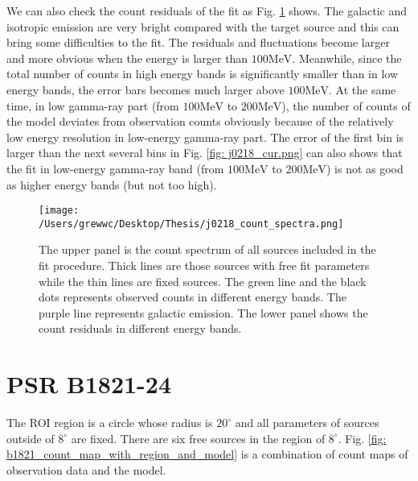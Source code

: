 \documentclass[12pt]{report}
\newcommand{\singleFig}[3]{
  \begin{figure}[!ht]
    \centering
    \texttt{[image: /Users/grewwc/Desktop/Thesis/\#1]}
    \caption{#3}
    \label{fig: #1}
  \end{figure}
}
\newcommand{\Notice}[1]{
  $<$\textbf{Notice}$>$#1$<$\textbf{/Notice}$>$
}
\begin{document}

            We can also check the count residuals of the fit as Fig. 
            \ref{fig: j0218_count_spectra} shows. The galactic and isotropic emission are very 
            bright compared with the target source and this can bring some difficulties to 
            the fit. The residuals and fluctuations become larger and more obvious 
            when the energy is larger than $100\mbox{MeV}$. 
            Meanwhile, since the total number of counts in high energy bands 
            is significantly smaller than in low energy bands, the error bars becomes much 
            larger above $100\mbox{MeV}$. At the same time, in low gamma-ray part 
            (from $100\mbox{MeV}$ to $200\mbox{MeV}$), the number of counts of the model 
            deviates from observation counts obviously because of the relatively low energy 
            resolution in low-energy gamma-ray part. The error of the first bin is larger
            than the next several bins in Fig. \ref{fig: j0218_cur.png} can also shows that 
            the fit in low-energy gamma-ray band (from $100\mbox{MeV}$ to $200\mbox{MeV}$) 
            is not as good as higher energy bands (but not too high). 
            
            \begin{figure}[!ht]
              \centering
              \texttt{[image: /Users/grewwc/Desktop/Thesis/j0218\_count\_spectra.png]}
              \caption{The upper panel is the count spectrum of all sources included in the 
                      fit procedure. Thick lines are those sources with free fit parameters 
                      while the thin lines are fixed sources. The green line and the black 
                      dots represents observed counts in different energy bands. The purple 
                      line represents galactic emission. The lower panel shows the count 
                      residuals in different energy bands. } 
              \label{fig: j0218_count_spectra}
            \end{figure}

            \section{PSR B1821-24}
              The ROI region is a circle whose radius is $20^\circ$ and all 
              parameters of sources outside of $8^\circ$ are fixed. 
              There are six free sources in the region of $8^\circ$. Fig.
              \ref{fig: b1821_count_map_with_region_and_model} 
              is a combination of count maps of observation data and the model. 
\end{document}
